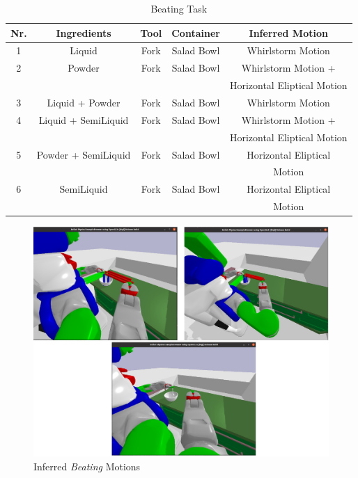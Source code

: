 \begin{table}[H]
  \centering
  \begin{tabular}{|c|c|c|c|c|}
    \hline
    \textbf{Nr.} & \textbf{Ingredients} & \textbf{Tool} & \textbf{Container} & \textbf{Inferred Motion}  \\
    \hline
    1 & Liquid & Fork & Salad Bowl & Whirlstorm Motion \\
    \hline
    2 & Powder & Fork & Salad Bowl & Whirlstorm Motion +
    \\ & & &  & Horizontal Eliptical Motion \\
    \hline
    3 & Liquid + Powder & Fork & Salad Bowl & Whirlstorm Motion \\
    \hline
    4 & Liquid + SemiLiquid & Fork & Salad Bowl & Whirlstorm Motion +
    \\ & & &  & Horizontal Eliptical Motion \\
    \hline
    5 & Powder + SemiLiquid & Fork & Salad Bowl & Horizontal Eliptical 
    \\ & & &  & Motion \\
    
    \hline
    6 & SemiLiquid & Fork & Salad Bowl & Horizontal Eliptical 
    \\ & & &  & Motion \\
    \hline
  \end{tabular}
  \caption{Beating Task}
  \label{tab:mixingtask}
\end{table}

\begin{figure}[H]
  \includegraphics[scale=0.33]{Graphics/beating_evaluation.jpg}
  \caption{Inferred \textit{Beating} Motions}
  \label{fig:mixingverb WikiHow}
\end{figure}


